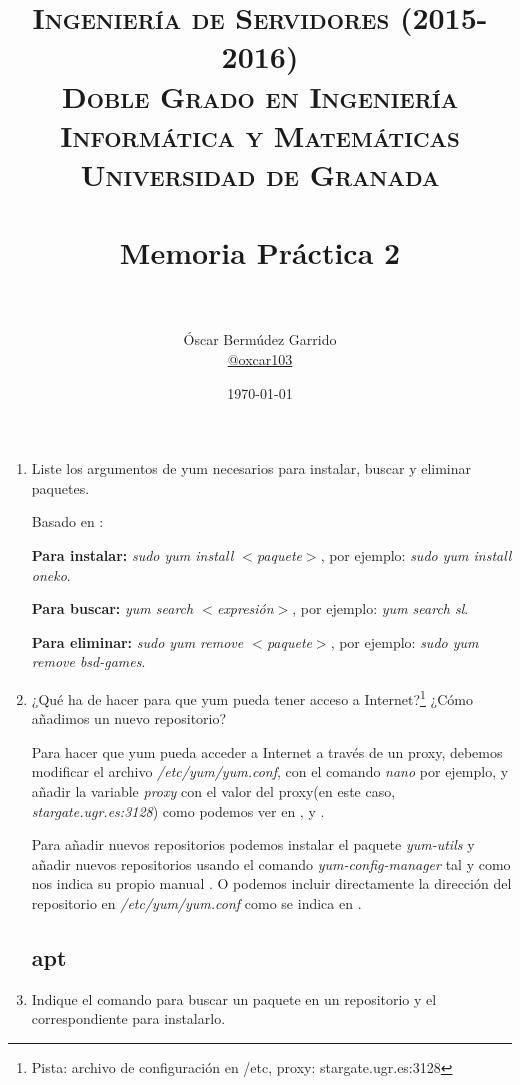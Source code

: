 \documentclass[paper=a4, fontsize=11pt]{scrartcl} %
\title{	
\normalfont \normalsize 
\textsc{{\bf Ingeniería de Servidores (2015-2016)} \\ Doble Grado en Ingeniería Informática y Matemáticas \\ Universidad de Granada} \\ [25pt] %
\horrule{0.5pt} \\[0.4cm] %
\huge Memoria Práctica 2 \\ %
\horrule{2pt} \\[0.5cm] %
}
\author{Óscar Bermúdez Garrido\\ \href{http://www.github.com/oxcar103}{@oxcar103}} %
\date{\normalsize\today} %
\numberwithin{equation}{section} %
\numberwithin{figure}{section} %
\numberwithin{table}{section} %
\begin{document}
\maketitle %
\newpage %
\tableofcontents %
\listoffigures

\begin{enumerate}
	\section{Instalación de servicios y configuración}
	\subsection{yum}
	\item Liste los argumentos de yum necesarios para instalar, buscar y eliminar paquetes.
	
	Basado en \cite{man_yum}:
	
	\textbf{Para instalar:} \textit{sudo yum install $<$paquete$>$}, por ejemplo: \textit{sudo yum
	install oneko}.
	
	\textbf{Para buscar:} \textit{yum search $<$expresión$>$}, por ejemplo: \textit{yum search sl}.
	
	\textbf{Para eliminar:} \textit{sudo yum remove $<$paquete$>$}, por ejemplo: \textit{sudo yum
	remove bsd-games}.
	
	
	\item ¿Qué ha de hacer para que yum pueda tener acceso a Internet?\footnote{Pista: archivo de
	configuración en /etc, proxy: stargate.ugr.es:3128} ¿Cómo añadimos un nuevo repositorio?
	
	Para hacer que yum pueda acceder a Internet a través de un proxy, debemos modificar el archivo
	\textit{/etc/yum/yum.conf}, con el comando \textit{nano} por ejemplo, y añadir la variable
	\textit{proxy} con el valor del proxy(en este caso, \textit{stargate.ugr.es:3128}) como podemos
	ver en \cite{man_yum.conf}, \cite{CentOS_web} y \cite{foro_Fedora}.
	
	Para añadir nuevos repositorios podemos instalar el paquete \textit{yum-utils} y añadir nuevos
	repositorios usando el comando \textit{yum-config-manager} tal y como nos indica su propio manual
	\cite{man_yum-config-manager}. O podemos incluir directamente la dirección del repositorio en
	\textit{/etc/yum/yum.conf} como se indica en \cite{man_yum.conf}.
	
	\subsection{apt}
	\item Indique el comando para buscar un paquete en un repositorio y el correspondiente para instalarlo.
	

\end{enumerate}
\end{document}
